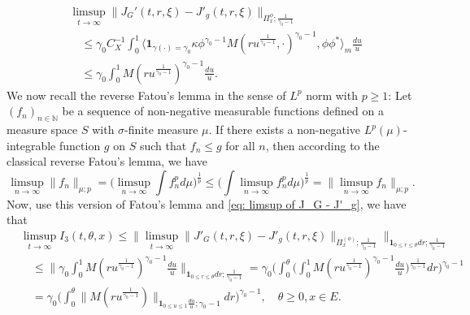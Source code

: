 \documentclass[12pt, a4paper]{amsart}
\theoremstyle{definition}
\numberwithin{equation}{section}
\begin{document}
\[\label{eq: limsup of J_G - J'_g}\begin{split}
	&\limsup_{t\to \infty} \| J_G'(t,r,\xi) - J'_g(t,r,\xi) \|_{\Pi_x^{\phi};\frac{1}{\gamma_0 - 1}}
	\\&\quad\leq  \gamma_0 C_X^{-1} \int_0^1 \big\langle \mathbf 1_{\gamma(\cdot) = \gamma_0} \kappa \phi^{\gamma_0 - 1} M(ru^{\frac{1}{\gamma_0 - 1}},\cdot)^{\gamma_0 - 1}, \phi\phi^* \big\rangle_m \frac{du}{u}
	\\&\quad\leq  \gamma_0  \int_0^1  M(ru^{\frac{1}{\gamma_0 - 1}})^{\gamma_0 - 1} \frac{du}{u}.
\end{split}\]
	We now recall the reverse Fatou's lemma in the sense of $L^p$ norm with $p\geq 1$: Let $(f_n)_{n\in \mathbb N}$ be a sequence of non-negative measurable functions defined on a measure space $S$ with $\sigma$-finite measure $\mu$. If there exists a non-negative $L^p(\mu)$-integrable function $g$ on $S$ such that $f_n \leq g$ for all $n$, then according to the classical reverse Fatou's lemma, we have
\[
	\limsup_{n\to \infty}\big\| f_n \big\|_{\mu;p} 
	= \big (   \limsup_{n\to \infty}  \int f^p_n d\mu        \big)^{\frac{1}{p}} 
	\leq  \big (   \int \limsup_{n\to \infty} f^p_n d\mu        \big)^{\frac{1}{p}} 
	= \big\| \limsup_{n\to \infty} f_n \big\|_{\mu;p}.
\]
	Now, use this version of Fatou's lemma and \eqref{eq: limsup of J_G - J'_g}, we have that
\[\begin{split}
	&\limsup_{t\to \infty} I_3(t,\theta, x)
	\leq \big\| \limsup_{t\to \infty} \|    J'_G(t,r,\xi) - J'_g(t,r,\xi) \|_{\Pi_x^{(\phi)};\frac{1}{\gamma_0 - 1}} \big\|_{\mathbf 1_{0\leq r\leq \theta} dr;\frac{1}{\gamma_0 - 1}}
	\\&\quad\leq \Big\| \gamma_0  \int_0^1  M(ru^{\frac{1}{\gamma_0 - 1}})^{\gamma_0 - 1} \frac{du}{u} \Big\|_{\mathbf 1_{0\leq r\leq \theta} dr;\frac{1}{\gamma_0 - 1}}
	= \gamma_0 \bigg( \int_0^\theta \Big (   \int_0^1  M(ru^{\frac{1}{\gamma_0 - 1}})^{\gamma_0 - 1} \frac{du}{u}   \Big )^{\frac{1}{\gamma_0 - 1}} dr \bigg)^{\gamma_0 - 1}
	\\&\quad = \gamma_0 \Big(  \int_0^\theta  \| M(r u^{\frac{1}{\gamma_0 - 1}}) \|_{\mathbf 1_{0\leq u\leq 1}\frac{du}{u};\gamma_0 - 1}  dr\Big)^{\gamma_0 - 1}, 
	\quad \theta \geq 0, x\in E.
\end{split}\]
	
\end{document}
